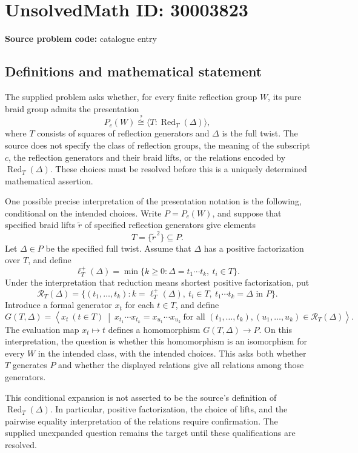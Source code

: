 \documentclass[11pt]{article}
\begin{document}
\section*{UnsolvedMath ID: 30003823}
\textbf{Source problem code:} catalogue entry
\subsection{Definitions and mathematical statement}
The supplied problem asks whether, for every finite reflection group \(W\), its pure braid group admits the presentation
\[
P_c(W)\stackrel{?}{\cong}\langle T:\operatorname{Red}_T(\Delta)\rangle,
\]
where \(T\) consists of squares of reflection generators and \(\Delta\) is the full twist. The source does not specify the class of reflection groups, the meaning of the subscript \(c\), the reflection generators and their braid lifts, or the relations encoded by \(\operatorname{Red}_T(\Delta)\). These choices must be resolved before this is a uniquely determined mathematical assertion.

One possible precise interpretation of the presentation notation is the following, conditional on the intended choices. Write \(P=P_c(W)\), and suppose that specified braid lifts \(\widetilde r\) of specified reflection generators give elements
\[
T=\{\widetilde r^{\,2}\}\subseteq P.
\]
Let \(\Delta\in P\) be the specified full twist. Assume that \(\Delta\) has a positive factorization over \(T\), and define
\[
\ell_T^+(\Delta)=\min\{k\geq 0:\Delta=t_1\cdots t_k,\ t_i\in T\}.
\]
Under the interpretation that reduction means shortest positive factorization, put
\[
\mathcal R_T(\Delta)=\{(t_1,\ldots,t_k):k=\ell_T^+(\Delta),\ t_i\in T,\ t_1\cdots t_k=\Delta\text{ in }P\}.
\]
Introduce a formal generator \(x_t\) for each \(t\in T\), and define
\[
G(T,\Delta)=\left\langle x_t\ (t\in T)\ \middle|\ x_{t_1}\cdots x_{t_k}=x_{u_1}\cdots x_{u_k}\ \text{for all }(t_1,\ldots,t_k),(u_1,\ldots,u_k)\in\mathcal R_T(\Delta)\right\rangle.
\]
The evaluation map \(x_t\mapsto t\) defines a homomorphism \(G(T,\Delta)\to P\). On this interpretation, the question is whether this homomorphism is an isomorphism for every \(W\) in the intended class, with the intended choices. This asks both whether \(T\) generates \(P\) and whether the displayed relations give all relations among those generators.

This conditional expansion is not asserted to be the source's definition of \(\operatorname{Red}_T(\Delta)\). In particular, positive factorization, the choice of lifts, and the pairwise equality interpretation of the relations require confirmation. The supplied unexpanded question remains the target until these qualifications are resolved.
\end{document}
